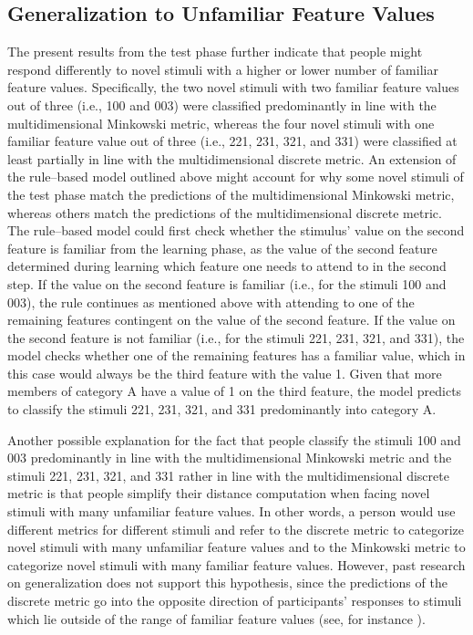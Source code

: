 \documentclass[a4paper,man,natbib]{apa6}
\begin{document}
\subsection{Generalization to Unfamiliar Feature Values}
The present results from the test phase further indicate that people might respond differently to novel stimuli with a higher or lower number of familiar feature values. Specifically, the two novel stimuli with two familiar feature values out of three (i.e., 100 and 003) were classified predominantly in line with the multidimensional Minkowski metric, whereas the four novel stimuli with one familiar feature value out of three (i.e., 221, 231, 321, and 331) were classified at least partially in line with the multidimensional discrete metric. 
An extension of the rule--based model outlined above might account for why some novel stimuli of the test phase match the predictions of the multidimensional Minkowski metric, whereas others match the predictions of the multidimensional discrete metric. The rule--based model could first check whether the stimulus' value on the second feature is familiar from the learning phase, as the value of the second feature determined during learning which feature one needs to attend to in the second step. If the value on the second feature is familiar (i.e., for the stimuli 100 and 003), the rule continues as mentioned above with attending to one of the remaining features contingent on the value of the second feature. If the value on the second feature is not familiar (i.e., for the stimuli 221, 231, 321, and 331), the model checks whether one of the remaining features has a familiar value, which in this case would always be the third feature with the value 1. Given that more members of category A have a value of 1 on the third feature, the model predicts to classify the stimuli 221, 231, 321, and 331 predominantly into category A. 

Another possible explanation for the fact that people classify the stimuli 100 and 003 predominantly in line with the multidimensional Minkowski metric and the stimuli 221, 231, 321, and 331 rather in line with the multidimensional discrete metric is that people simplify their distance computation when facing novel stimuli with many unfamiliar feature values. In other words, a person would use different metrics for different stimuli and refer to the discrete metric to categorize novel stimuli with many unfamiliar feature values and to the Minkowski metric to categorize novel stimuli with many familiar feature values. However, past research on generalization does not support this hypothesis, since the predictions of the discrete metric go into the opposite direction of participants' responses to stimuli which lie outside of the range of familiar feature values (see, for instance \citealp{erickson2002rule, denton2008rule}).
\end{document}
